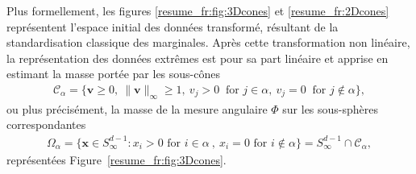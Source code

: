 \documentclass[a4paper, 12pt]{article}
\def\mb{\mathbf}
\begin{document}
Plus formellement, les figures \ref{resume_fr:fig:3Dcones} et \ref{resume_fr:2Dcones} représentent l'espace initial des données transformé, résultant de la standardisation classique des marginales. Après cette transformation non linéaire, la représentation des données extrêmes est pour sa part linéaire et apprise en estimant la masse portée par les sous-cônes
%
\begin{align*}
 \mathcal{C}_\alpha = \{\mb v \ge 0,~\|\mb v\|_\infty \ge 1,~ v_j > 0 ~\text{ for } j \in \alpha,~ v_j = 0 ~\text{ for } j \notin \alpha \},
\end{align*}
ou plus précisément, la masse de la mesure angulaire $\Phi$ sur les sous-sphères correspondantes
\begin{align*}
\Omega_{\alpha}  = \{\mb x \in S_{\infty}^{d-1} :  x_i > 0 \text{ for } i\in\alpha~,~  x_i = 0 \text{ for } i\notin \alpha   \} 
 = S_{\infty}^{d-1}\cap {\mathcal{C}}_\alpha,
\end{align*}
représentées Figure~\ref{resume_fr:fig:3Dcones}.
\end{document}
